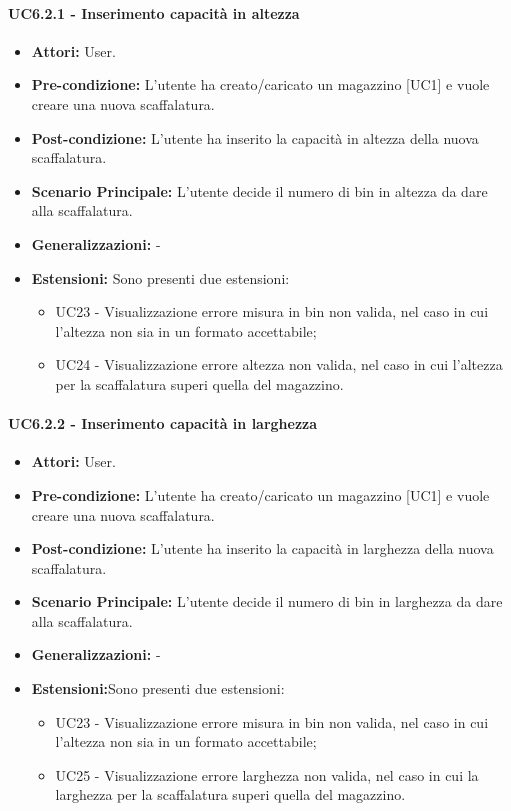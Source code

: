 \paragraph{UC6.2.1 - Inserimento capacità in altezza}
\begin{itemize}
    \item \textbf{Attori:} User.
    \item \textbf{Pre-condizione:} L'utente ha creato/caricato un magazzino [UC1] e vuole creare una nuova scaffalatura.
    \item \textbf{Post-condizione:}  L'utente ha inserito la capacità in altezza della nuova scaffalatura.
    \item \textbf{Scenario Principale:}  L'utente decide il numero di bin in altezza da dare alla scaffalatura. 
    \item \textbf{Generalizzazioni:} -
    \item \textbf{Estensioni:} Sono presenti due estensioni:
    \begin{itemize}
        \item UC23 - Visualizzazione errore misura in bin non valida, nel caso in cui l'altezza non sia in un formato accettabile;
        \item UC24 - Visualizzazione errore altezza non valida, nel caso in cui l'altezza per la scaffalatura superi quella del magazzino.
    \end{itemize}
\end{itemize}


\paragraph{UC6.2.2 - Inserimento capacità in larghezza}
\begin{itemize}
    \item \textbf{Attori:} User.
    \item \textbf{Pre-condizione:} L'utente ha creato/caricato un magazzino [UC1] e vuole creare una nuova scaffalatura.
    \item \textbf{Post-condizione:}  L'utente ha inserito la capacità in larghezza della nuova scaffalatura.
    \item \textbf{Scenario Principale:}  L'utente decide il numero di bin in larghezza da dare alla scaffalatura.
    \item \textbf{Generalizzazioni:} -
    \item \textbf{Estensioni:}Sono presenti due estensioni:
    \begin{itemize}
        \item UC23 - Visualizzazione errore misura in bin non valida, nel caso in cui l'altezza non sia in un formato accettabile;
        \item UC25 - Visualizzazione errore larghezza non valida, nel caso in cui la larghezza per la scaffalatura superi quella del magazzino.
    \end{itemize}
\end{itemize}